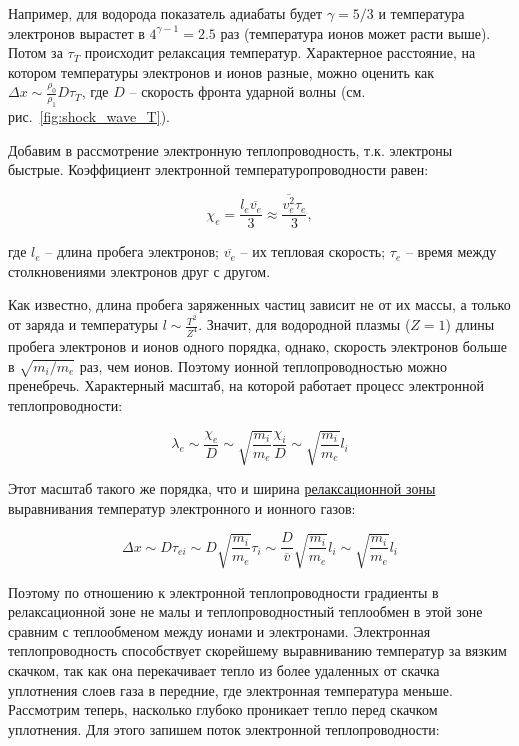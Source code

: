 \documentclass[10pt, a4paper]{article}
\begin{document}
Например, для водорода показатель адиабаты будет $\gamma=5/3$ и температура электронов вырастет в $4^{\gamma-1}=2.5$ раз (температура ионов может расти выше). Потом за $\tau_{T}$ происходит релаксация температур. Характерное расстояние, на котором температуры электронов и ионов разные, можно оценить как $\Delta x \sim \frac{\rho_0}{\rho_1}D\tau_{T}$, где $D$ -- скорость фронта ударной волны (см. рис.~\ref{fig:shock_wave_T}).

Добавим в рассмотрение электронную теплопроводность, т.к. электроны быстрые. Коэффициент электронной температуропроводности равен:

\begin{equation*}
	\chi_e = \frac{l_e \overline{v_e}}{3} \approx \frac{\overline{v_e^{2}} \tau_e}{3},
\end{equation*}

где $l_e$ -- длина пробега электронов; $\overline{v_e}$ -- их тепловая скорость; $\tau_e$ -- время между столкновениями электронов друг с другом.

Как известно, длина пробега заряженных частиц зависит не от их массы, а только от заряда и температуры $l\sim\frac{T^{2}}{Z^{4}}$. Значит, для водородной плазмы ($Z=1$) длины пробега электронов и ионов одного порядка, однако, скорость электронов больше в $\sqrt{m_i/m_e}$ раз, чем ионов. Поэтому ионной теплопроводностью можно пренебречь. Характерный масштаб, на которой работает процесс электронной теплопроводности:

\begin{equation*}
	\lambda_e \sim \frac{\chi_e}{D} \sim \sqrt{\frac{m_i}{m_e}} \frac{\chi_i}{D} \sim \sqrt{\frac{m_i}{m_e}} l_i
\end{equation*}

Этот масштаб такого же порядка, что и ширина \uline{релаксационной зоны} выравнивания температур электронного и ионного газов:

\begin{equation*}
	\Delta x \sim D \tau_{ei} \sim D \sqrt{\frac{m_i}{m_e}} \tau_i \sim \frac{D}{\overline{v}} \sqrt{\frac{m_i}{m_e}} l_i \sim \sqrt{\frac{m_i}{m_e}} l_i
\end{equation*}

Поэтому по отношению к электронной теплопроводности градиенты в релаксационной зоне не малы и теплопроводностный теплообмен в этой зоне сравним с теплообменом между ионами и электронами. Электронная теплопроводность способствует скорейшему выравниванию температур за вязким скачком, так как она перекачивает тепло из более удаленных от скачка уплотнения слоев газа в передние, где электронная температура меньше. Рассмотрим теперь, насколько глубоко проникает тепло перед скачком уплотнения. Для этого запишем поток электронной теплопроводности:
\end{document}
